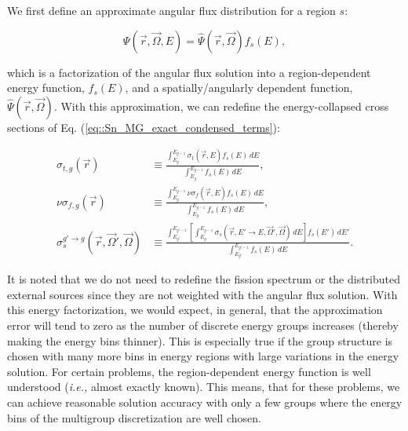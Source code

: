 We first define an approximate angular flux distribution for a region $s$:

\begin{equation}
\label{eq::Sn_MG_flux_approx}
\Psi (\vec{r},\vec{\Omega}, E) =  \hat{\Psi} (\vec{r},\vec{\Omega}) f_{s} (E) ,
\end{equation}

\noindent which is a factorization of the angular flux solution into a region-dependent energy function, $f_s (E)$, and a spatially/angularly dependent function, $\hat{\Psi} (\vec{r},\vec{\Omega})$. With this approximation, we can redefine the energy-collapsed cross sections of Eq. (\ref{eq::Sn_MG_exact_condensed_terms}):

\begin{equation}
\label{eq::MG_approx_condensed_terms}
\begin{aligned}
\sigma_{t,g} (\vec{r}) & \equiv \frac{\int_{E_{g}}^{E_{g-1}} \sigma_{t} (\vec{r},E) f_{s} (E) \, dE}{\int_{E_{g}}^{E_{g-1}} f_{s} (E) \, dE} ,\\
\nu\sigma_{f,g} (\vec{r}) & \equiv \frac{\int_{E_{g}}^{E_{g-1}} \nu\sigma_{f} (\vec{r},E)  f_{s} (E) \, dE }{\int_{E_{g}}^{E_{g-1}} f_{s} (E) \, dE}, \\
\sigma_{s}^{g' \rightarrow g} (\vec{r},\vec{\Omega}' , \vec{\Omega} ) & \equiv \frac{\int_{E_{g'}}^{E_{g'-1}} \left[ \int_{E_{g}}^{E_{g-1}} \sigma_s (\vec{r},E' \rightarrow E,\vec{\Omega}' , \vec{\Omega} ) \, dE \right] f_{s} (E')\, dE' }{\int_{E_{g'}}^{E_{g'-1}}  f_{s} (E) \, dE} .
\end{aligned}
\end{equation}

\noindent It is noted that we do not need to redefine the fission spectrum or the distributed external sources since they are not weighted with the angular flux solution. With this energy factorization, we would expect, in general, that the approximation error will tend to zero as the number of discrete energy groups increases (thereby making the energy bins thinner). This is especially true if the group structure is chosen with many more bins in energy regions with large variations in the energy solution. For certain problems, the region-dependent energy function is well understood ({\em i.e.,} almost exactly known). This means, that for these problems, we can achieve reasonable solution accuracy with only a few groups where the energy bins of the multigroup discretization are well chosen.

